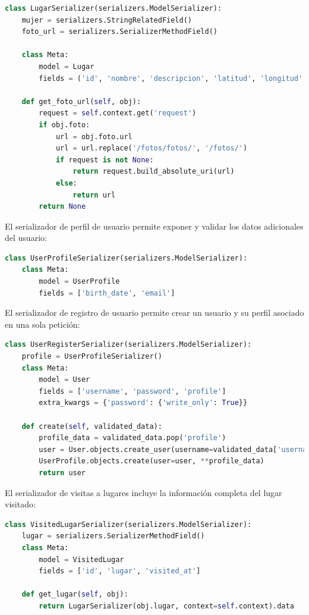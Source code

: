 \begin{lstlisting}[language=Python, caption={Serializador Lugar}]
class LugarSerializer(serializers.ModelSerializer):
    mujer = serializers.StringRelatedField()
    foto_url = serializers.SerializerMethodField()

    class Meta:
        model = Lugar
        fields = ('id', 'nombre', 'descripcion', 'latitud', 'longitud', 'mujer', 'foto', 'foto_url', 'ar_url')

    def get_foto_url(self, obj):
        request = self.context.get('request')
        if obj.foto:
            url = obj.foto.url
            url = url.replace('/fotos/fotos/', '/fotos/')
            if request is not None:
                return request.build_absolute_uri(url)
            else:
                return url
        return None
\end{lstlisting}

El serializador de perfil de usuario permite exponer y validar los datos adicionales del usuario:

\begin{lstlisting}[language=Python, caption={Serializador UserProfile}]
class UserProfileSerializer(serializers.ModelSerializer):
    class Meta:
        model = UserProfile
        fields = ['birth_date', 'email']
\end{lstlisting}

El serializador de registro de usuario permite crear un usuario y su perfil asociado en una sola petición:

\begin{lstlisting}[language=Python, caption={Serializador UserRegister}]
class UserRegisterSerializer(serializers.ModelSerializer):
    profile = UserProfileSerializer()
    class Meta:
        model = User
        fields = ['username', 'password', 'profile']
        extra_kwargs = {'password': {'write_only': True}}

    def create(self, validated_data):
        profile_data = validated_data.pop('profile')
        user = User.objects.create_user(username=validated_data['username'], password=validated_data['password'])
        UserProfile.objects.create(user=user, **profile_data)
        return user
\end{lstlisting}

El serializador de visitas a lugares incluye la información completa del lugar visitado:

\begin{lstlisting}[language=Python, caption={Serializador VisitedLugar}]
class VisitedLugarSerializer(serializers.ModelSerializer):
    lugar = serializers.SerializerMethodField()
    class Meta:
        model = VisitedLugar
        fields = ['id', 'lugar', 'visited_at']

    def get_lugar(self, obj):
        return LugarSerializer(obj.lugar, context=self.context).data
\end{lstlisting}

